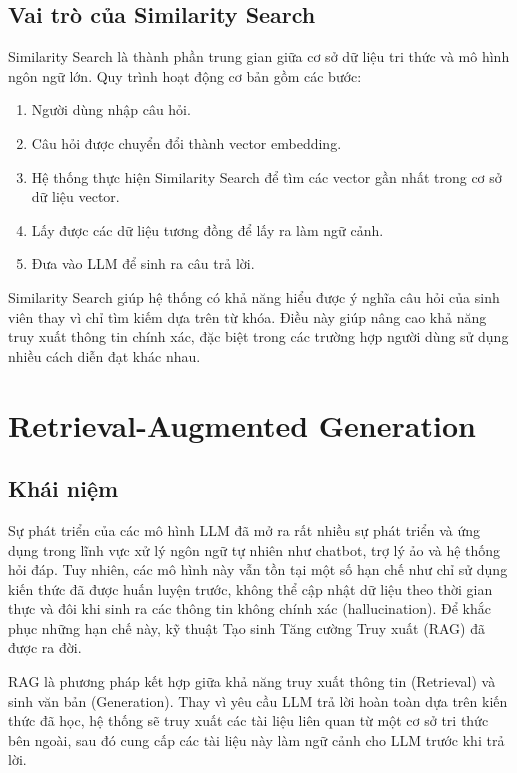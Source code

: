\documentclass[../DoAn.tex]{subfiles}
\begin{document}
\subsection{Vai trò của Similarity Search}
Similarity Search là thành phần trung gian giữa cơ sở dữ liệu tri thức và mô hình ngôn ngữ lớn. Quy trình hoạt động cơ bản gồm các bước:
\begin{enumerate}[label=\textbf{Bước \arabic*.}, leftmargin=*]
    \item Người dùng nhập câu hỏi.
    \item Câu hỏi được chuyển đổi thành vector embedding.
    \item Hệ thống thực hiện Similarity Search để tìm các vector gần nhất trong cơ sở dữ liệu vector.
    \item Lấy được các dữ liệu tương đồng để lấy ra làm ngữ cảnh.
    \item Đưa vào LLM để sinh ra câu trả lời.
\end{enumerate}
\hspace*{1em}Similarity Search giúp hệ thống có khả năng hiểu được ý nghĩa câu hỏi của sinh viên thay vì chỉ tìm kiếm dựa trên từ khóa. Điều này giúp nâng cao khả năng truy xuất thông tin chính xác, đặc biệt trong các trường hợp người dùng sử dụng nhiều cách diễn đạt khác nhau.

\section{Retrieval-Augmented Generation}
\subsection{Khái niệm}
Sự phát triển của các mô hình LLM đã mở ra rất nhiều sự phát triển và ứng dụng trong lĩnh vực xử lý ngôn ngữ tự nhiên như chatbot, trợ lý ảo và hệ thống hỏi đáp. Tuy nhiên, các mô hình này vẫn tồn tại một số hạn chế như chỉ sử dụng kiến thức đã được huấn luyện trước, không thể cập nhật dữ liệu theo thời gian thực và đôi khi sinh ra các thông tin không chính xác (hallucination). Để khắc phục những hạn chế này, kỹ thuật Tạo sinh Tăng cường Truy xuất (RAG) đã được ra đời.

RAG là phương pháp kết hợp giữa khả năng truy xuất thông tin (Retrieval) và sinh văn bản (Generation). Thay vì yêu cầu LLM trả lời hoàn toàn dựa trên kiến thức đã học, hệ thống sẽ truy xuất các tài liệu liên quan từ một cơ sở tri thức bên ngoài, sau đó cung cấp các tài liệu này làm ngữ cảnh cho LLM trước khi trả lời.
\end{document}
